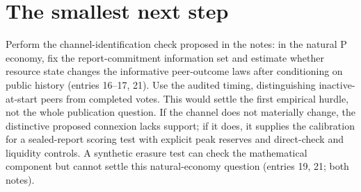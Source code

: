 \documentclass{article}
\begin{document}
\section*{The smallest next step}
Perform the channel-identification check proposed in the notes: in the natural P economy, fix the
report-commitment information set and estimate whether resource state changes the informative
peer-outcome laws after conditioning on public history (entries 16--17, 21).
Use the audited timing, distinguishing inactive-at-start peers from completed votes.
This would settle the first empirical hurdle, not the whole publication question.
If the channel does not materially change, the distinctive proposed connexion lacks support; if it
does, it supplies the calibration for a sealed-report scoring test with explicit peak reserves and
direct-check and liquidity controls.
A synthetic erasure test can check the mathematical component but cannot settle this natural-economy
question (entries 19, 21; both notes).
\end{document}
